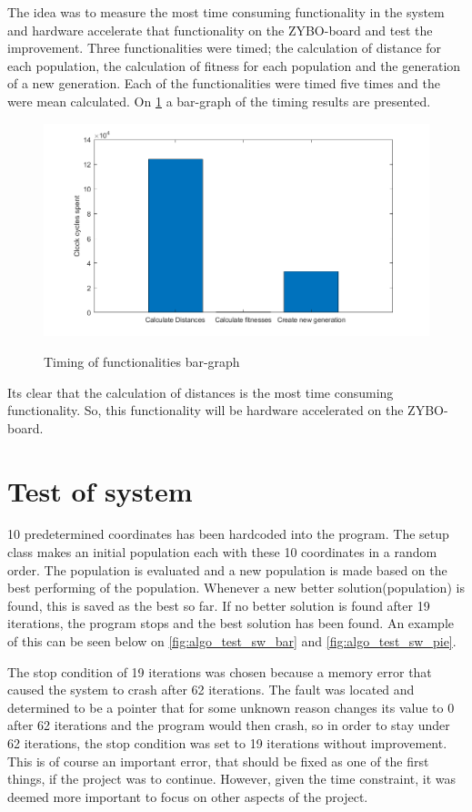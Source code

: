 The idea was to measure the most time consuming functionality in the system and hardware accelerate that functionality on the ZYBO-board and test the improvement. Three functionalities were timed; the calculation of distance for each population, the calculation of fitness for each population and the generation of a new generation. Each of the functionalities were timed five times and the were mean calculated. On \cref{fig:timing_barGraph} a bar-graph of the timing results are presented. 

\begin{figure}[H]
	\centering
	{\includegraphics[width=\textwidth]{Images/timing_barGraph.png}}\\[0.5cm]
	\caption{Timing of functionalities bar-graph}
	\label{fig:timing_barGraph}
\end{figure}

Its clear that the calculation of distances is the most time consuming functionality. So, this functionality will be hardware accelerated on the ZYBO-board.


\section{Test of system}
10 predetermined coordinates has been hardcoded into the program. The setup class makes an initial population each with these 10 coordinates in a random order. The population is evaluated and a new population is made based on the best performing of the population. Whenever a new better solution(population) is found, this is saved as the best so far. If no better solution is found after 19 iterations, the program stops and the best solution has been found. An example of this can be seen below on \cref{fig:algo_test_sw_bar} and \cref{fig:algo_test_sw_pie}.

The stop condition of 19 iterations was chosen because a memory error that caused the system to crash after 62 iterations. The fault was located and determined to be a pointer that for some unknown reason changes its value to 0 after 62 iterations and the program would then crash, so in order to stay under 62 iterations, the stop condition was set to 19 iterations without improvement. This is of course an important error, that should be fixed as one of the first things, if the project was to continue. However, given the time constraint, it was deemed more important to focus on other aspects of the project.

